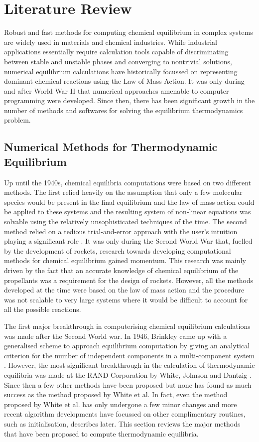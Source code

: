 \chapter{Literature Review} \label{chap:litreview}

	Robust and fast methods for computing chemical equilibrium in complex systems are widely used in materials and chemical industries. While industrial applications essentially require calculation tools capable of discriminating between stable and unstable phases and converging to nontrivial solutions, numerical equilibrium calculations have historically focussed on representing dominant chemical reactions using the Law of Mass Action. It was only during and after World War {II} that numerical approaches amenable to computer programming were developed. Since then, there has been significant growth in the number of methods and softwares for solving the equilibrium thermodynamics problem.
	
\section{Numerical Methods for Thermodynamic Equilibrium}
	Up until the 1940s, chemical equilibria computations were based on two different methods. The first relied heavily on the assumption that only a few molecular species would be present in the final equilibrium and the law of mass action could be applied to these systems and the resulting system of non-linear equations was solvable using the relatively unsophisticated techniques of the time. The second method relied on a tedious trial-and-error approach with the user's intuition playing a significant role \cite{vanZeggeren11}. It was only during the Second World War that, fuelled by the development of rockets, research towards developing computational methods for chemical equilibrium gained momentum. This research was mainly driven by the fact that an accurate knowledge of chemical equilibrium of the propellants was a requirement for the design of rockets. However, all the methods developed at the time were based on the law of mass action and the procedure was not scalable to very large systems where it would be difficult to account for all the possible reactions.

	The first major breakthrough in computerising chemical equilibrium calculations was made after the Second World war. In 1946, Brinkley came up with a generalised scheme to approach equilibrium computation by giving an analytical criterion for the number of independent components in a multi-component system \cite{vanZeggeren11}. However, the most significant breakthrough in the calculation of thermodynamic equilibria was made at the RAND Corporation by White, Johnson and Dantzig  \cite{White:58}. Since then a few other methods have been proposed but none has found as much success as the method proposed by White et al. In fact, even the method proposed by White et al. has only undergone a few minor changes and more recent algorithm developments have focussed on other complimentary routines, such as initialisation, describes later. This section reviews the major methods that have been proposed to compute thermodynamic equilibria.

